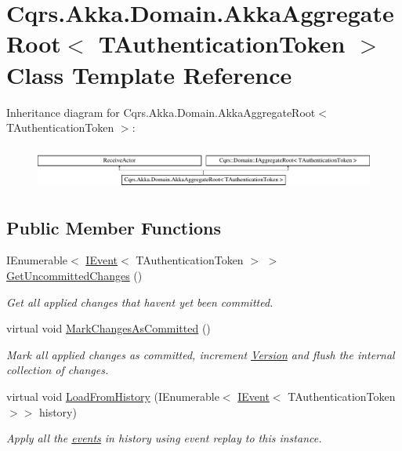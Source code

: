 \hypertarget{classCqrs_1_1Akka_1_1Domain_1_1AkkaAggregateRoot}{}\section{Cqrs.\+Akka.\+Domain.\+Akka\+Aggregate\+Root$<$ T\+Authentication\+Token $>$ Class Template Reference}
\label{classCqrs_1_1Akka_1_1Domain_1_1AkkaAggregateRoot}
Inheritance diagram for Cqrs.\+Akka.\+Domain.\+Akka\+Aggregate\+Root$<$ T\+Authentication\+Token $>$\+:\begin{figure}[H]
\begin{center}
\leavevmode
\includegraphics[height=1.454545cm]{classCqrs_1_1Akka_1_1Domain_1_1AkkaAggregateRoot}
\end{center}
\end{figure}
\subsection*{Public Member Functions}
\begin{DoxyCompactItemize}
\item 
I\+Enumerable$<$ \hyperlink{interfaceCqrs_1_1Events_1_1IEvent}{I\+Event}$<$ T\+Authentication\+Token $>$ $>$ \hyperlink{classCqrs_1_1Akka_1_1Domain_1_1AkkaAggregateRoot_a2d11510fec0129ba318f63f7103aeec0_a2d11510fec0129ba318f63f7103aeec0}{Get\+Uncommitted\+Changes} ()
\begin{DoxyCompactList}\small\item\em Get all applied changes that haven\textquotesingle{}t yet been committed. \end{DoxyCompactList}\item 
virtual void \hyperlink{classCqrs_1_1Akka_1_1Domain_1_1AkkaAggregateRoot_a0d2615067175e5f8249bb2dc3d17ee0b_a0d2615067175e5f8249bb2dc3d17ee0b}{Mark\+Changes\+As\+Committed} ()
\begin{DoxyCompactList}\small\item\em Mark all applied changes as committed, increment \hyperlink{classCqrs_1_1Akka_1_1Domain_1_1AkkaAggregateRoot_a4b526322c63542b1da2a700ff1b48d0c_a4b526322c63542b1da2a700ff1b48d0c}{Version} and flush the internal collection of changes. \end{DoxyCompactList}\item 
virtual void \hyperlink{classCqrs_1_1Akka_1_1Domain_1_1AkkaAggregateRoot_af6d84b07d4e9475bb88e769ac9081830_af6d84b07d4e9475bb88e769ac9081830}{Load\+From\+History} (I\+Enumerable$<$ \hyperlink{interfaceCqrs_1_1Events_1_1IEvent}{I\+Event}$<$ T\+Authentication\+Token $>$$>$ history)
\begin{DoxyCompactList}\small\item\em Apply all the \hyperlink{}{events} in {\itshape history}  using event replay to this instance. \end{DoxyCompactList}\end{DoxyCompactItemize}
